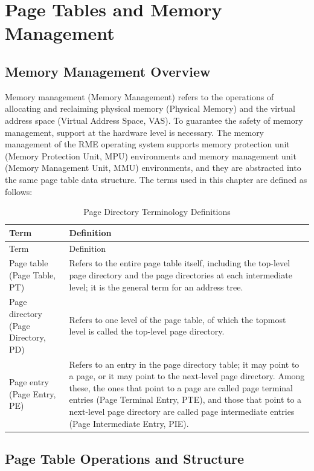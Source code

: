 \chapter{Page Tables and Memory Management}\label{ch:page-tables-and-memory-management}

\section{Memory Management Overview}\label{sec:3-memory-management-overview}

Memory management (Memory Management) refers to the operations of allocating and reclaiming physical
memory (Physical
Memory) and the virtual address
space (Virtual Address
Space, VAS). To guarantee the safety of memory management, support at the hardware level is necessary. The memory management of the RME operating system supports memory
protection unit (Memory
Protection Unit, MPU) environments and memory management
unit (Memory Management
Unit, MMU) environments, and they are abstracted into the same page table data structure. The terms used in this chapter are defined as follows:

\begin{xltabular}{\textwidth}{@{}>{\hsize\raggedright\arraybackslash}X>{\hsize\raggedright\arraybackslash}X@{}}
\caption{Page Directory Terminology Definitions}\label{tab:3-1-page-directory-terminology}\\
\toprule
Term & Definition\tabularnewline
\endfirsthead
\toprule
Term & Definition\tabularnewline
\midrule
\endhead
\bottomrule
\endlastfoot
Page table (Page Table, PT) &
Refers to the entire page table itself, including the top-level page directory and the page directories at each intermediate level; it is the general term for an address tree.\tabularnewline
Page directory (Page Directory, PD) &
Refers to one level of the page table, of which the topmost level is called the top-level page directory.\tabularnewline
Page entry (Page Entry, PE) &
Refers to an entry in the page directory table; it may point to a page, or it may point to the next-level page directory. Among these, the ones that point to a page are called page
terminal entries (Page
Terminal Entry, PTE), and those that point to a next-level page directory are called page
intermediate entries (Page
Intermediate Entry, PIE).\tabularnewline
\end{xltabular}
\nopagebreak[4]

\section{Page Table Operations and Structure}\label{sec:3-page-table-operations-and-structure}

